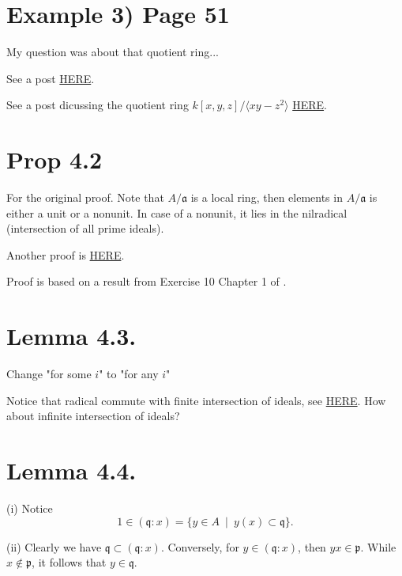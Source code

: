 
\section{Example 3) Page 51}

My question was about that quotient ring... 

See a post \href{https://math.stackexchange.com/questions/93478/is-each-power-of-a-prime-ideal-a-primary-ideal}{HERE}. 

See a post dicussing the quotient ring $k[x,y,z]/\langle xy-z^2\rangle$ \href{https://math.stackexchange.com/questions/3320367/mathbbcx-y-z-xy-z2-is-not-a-field}{HERE}. 

\section{Prop 4.2}

For the original proof. Note that $A/\mathfrak a$ is a local ring, then elements in $A/\mathfrak a$ is either a unit or a nonunit. In case of a nonunit, it lies in the nilradical (intersection of all prime ideals).

Another proof is \href{https://math.stackexchange.com/questions/649146/an-ideal-whose-radical-is-maximal-is-primary}{HERE}.

Proof is based on a result from Exercise 10 Chapter 1 of \cite{atiyah1994introduction}.

\section{Lemma 4.3.}

Change "for some $i$" to "for any $i$" 

Notice that radical commute with finite intersection of ideals, see \href{https://en.wikipedia.org/wiki/Radical_of_an_ideal}{HERE}. 
How about infinite intersection of ideals?

\section{Lemma 4.4.}

(i) Notice \[1\in (\mathfrak q:x)=\{y\in A ~\mid~ y(x)\subset \mathfrak q\}.\]

(ii) Clearly we have $\mathfrak q\subset (\mathfrak q:x)$.
Conversely, for $y\in (\mathfrak q:x)$, then $yx\in \mathfrak p$. While $x\notin \mathfrak p$, it follows that $y\in \mathfrak q$.